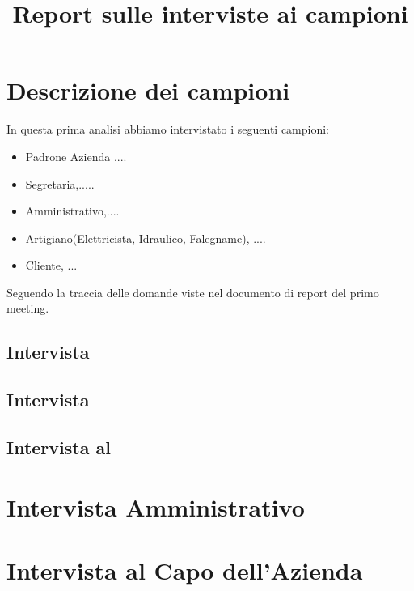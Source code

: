 \documentclass[11pt]{article}
\newcommand{\rosso}[1]{\color[rgb]{1,0,0}{#1}}
\newcommand{\blu}[1]{\color[rgb]{0,0,1}{#1}}
\newcommand{\verde}[1]{\color[rgb]{0,0.65,0.31}{#1}}
\begin{document}
\author{}
\title{Report sulle interviste ai campioni}
\maketitle

\section{Descrizione dei campioni}
In questa prima analisi abbiamo intervistato i seguenti campioni:
\begin{itemize}
\item Padrone Azienda .... 
\item Segretaria,.....
\item Amministrativo,....
\item Artigiano(Elettricista, Idraulico, Falegname), ....
\item Cliente, ... 
\end{itemize}
Seguendo la traccia delle domande viste nel documento di report del primo meeting. 

\subsection{Intervista \blu{Segretaria}}


\subsection{Intervista \verde{Artigiano}}


\subsection{Intervista al \rosso{Cliente}}


\section{Intervista Amministrativo}


\section{Intervista al Capo dell'Azienda}

\end{document}
